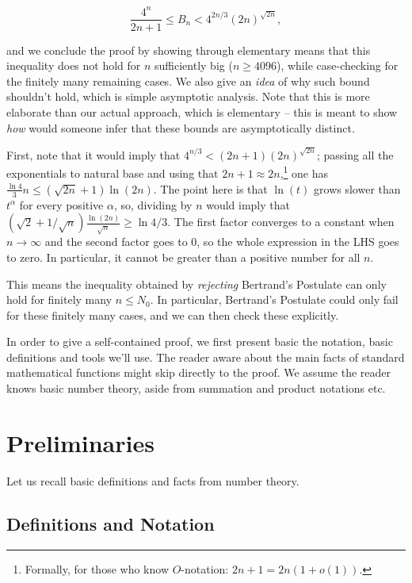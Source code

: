 \documentclass[11pt]{article}
\theoremstyle{remark}
\newcommand{\vs}{\vspace{10px}}
\begin{document}
\[\frac{4^n}{2n+1}\le B_n<4^{2n/3}(2n)^{\sqrt{2n}},\]

and we conclude the proof by showing through elementary means that this inequality does not hold for $n$ sufficiently big ($n\ge 4096$), while case-checking for the finitely many remaining cases. We also give an \textit{idea} of why such bound shouldn't hold, which is simple asymptotic analysis. Note that this is more elaborate than our actual approach, which is elementary -- this is meant to show \textit{how} would someone infer that these bounds are asymptotically distinct.
\vs

First, note that it would imply that $4^{n/3}< (2n+1)(2n)^{\sqrt{2n}}$; passing all the exponentials to natural base and using that $2n+1 \approx 2n$,\footnote{Formally, for those who know $O$-notation: $2n+1=2n(1+o(1))$.} one has $\frac{\ln4}{3}n\le (\sqrt{2n}+1)\ln(2n)$. The point here is that $\ln(t)$ grows slower than $t^\alpha$ for every positive $\alpha$, so, dividing by $n$ would imply that $(\sqrt{2}+1/\sqrt{n})\frac{\ln(2n)}{\sqrt{n}}\ge \ln4/3$. The first factor converges to a constant when $n\to \infty$ and the second factor goes to $0$, so the whole expression in the LHS goes to zero. In particular, it cannot be greater than a positive number for all $n$.

This means the inequality obtained by \textit{rejecting} Bertrand's Postulate can only hold for finitely many $n\le N_0$. In particular, Bertrand's Postulate could only fail for these finitely many cases, and we can then check these explicitly.

\vs

In order to give a self-contained proof, we first present basic the notation, basic definitions and tools we'll use. The reader aware about the main facts of standard mathematical functions might skip directly to the proof. We assume the reader knows basic number theory, aside from summation and product notations etc.

\section{Preliminaries}
Let us recall basic definitions and facts from number theory. 

\vs
\subsection{Definitions and Notation}
\end{document}
